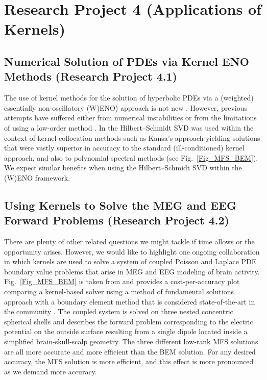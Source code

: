 \documentclass[11pt]{NSFamsart}
\begin{document}
\section{Research Project 4 (Applications of Kernels)}
\subsection{Numerical Solution of PDEs via Kernel ENO Methods (Research Project 4.1)} 
The use of kernel methods for the solution of hyperbolic PDEs via a (weighted) essentially non-oscillatory (W)ENO) approach is not new \citep{AboiyarEtAl06,CecilEtAl04,IskeSonar96}. However, previous attempts have suffered either from numerical instabilities \citep{CecilEtAl04} or from the limitations of using a low-order method \citep{AboiyarEtAl06,IskeSonar96}. In \citep{McCourt13} the Hilbert--Schmidt SVD was used within the context of kernel collocation methods such as Kansa's approach \citep{Fas07a} yielding solutions that were vastly superior in accuracy to the standard (ill-conditioned) kernel approach, and also to polynomial spectral methods (see Fig.~\ref{Fig_MFS_BEM}). We expect similar benefits when using the Hilbert--Schmidt SVD within the (W)ENO framework.

\subsection{Using Kernels to Solve the MEG and EEG Forward Problems (Research Project 4.2)}\label{SectMEEG}
There are plenty of other related questions we might tackle if time allows or the opportunity arises. However, we would like to highlight one ongoing collaboration in which kernels are used to solve a system of coupled Poisson and Laplace PDE boundary value problems that arise in MEG and EEG modeling of brain activity. Fig.~\ref{Fig_MFS_BEM} is taken from \citep{AFFGM13} and provides a cost-per-accuracy plot comparing a kernel-based solver using a method of fundamental solutions approach with a boundary element method that is considered state-of-the-art in the community \citep{fieldtrip11}. The coupled system is solved on three nested concentric spherical shells and describes the forward problem corresponding to the electric potential on the outside surface resulting from a single dipole located inside a simplified brain-skull-scalp geometry. The three different low-rank MFS solutions are all more accurate and more efficient than the BEM solution. For any desired accuracy, the MFS solution is more efficient, and this effect is more pronounced as we demand more accuracy.
\end{document}
